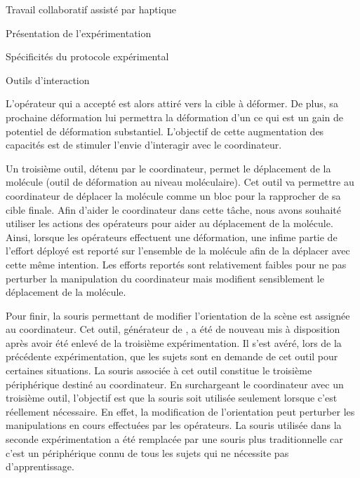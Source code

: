 \documentclass[myfrancais,ngerman,english,frenchb]{mythesis}
\begin{document}
\begin{mychapter}{Travail collaboratif assisté par haptique}
\begin{mysection}{Présentation de l'expérimentation}
\begin{mysubsection}{Spécificités du protocole expérimental}
\begin{mysubsubsection}{Outils d'interaction}
\begin{description}
							L'opérateur qui a accepté est alors attiré vers la cible à déformer.
							De plus, sa prochaine déformation lui permettra la déformation d'un  ce qui est un gain de potentiel de déformation substantiel.
							L'objectif de cette augmentation des capacités est de stimuler l'envie d'interagir avec le coordinateur.
						\item[Outil de manipulation]
							Un troisième outil, détenu par le coordinateur, permet le déplacement de la molécule (outil de déformation au niveau moléculaire).
							Cet outil va permettre au coordinateur de déplacer la molécule comme un bloc pour la rapprocher de sa cible finale.
							Afin d'aider le coordinateur dans cette tâche, nous avons souhaité utiliser les actions des opérateurs pour aider au déplacement de la molécule.
							Ainsi, lorsque les opérateurs effectuent une déformation, une infime partie de l'effort déployé est reporté sur l'ensemble de la molécule afin de la déplacer avec cette même intention.
							Les efforts reportés sont relativement faibles pour ne pas perturber la manipulation du coordinateur mais modifient sensiblement le déplacement de la molécule.
						\item[Outil d'orientation]
							Pour finir, la souris permettant de modifier l'orientation de la scène est assignée au coordinateur.
							Cet outil, générateur de , a été de nouveau mis à disposition après avoir été enlevé de la troisième expérimentation.
							Il s'est avéré, lors de la précédente expérimentation, que les sujets sont en demande de cet outil pour certaines situations.
							La souris associée à cet outil constitue le troisième périphérique destiné au coordinateur.
							En surchargeant le coordinateur avec un troisième outil, l'objectif est que la souris soit utilisée seulement lorsque c'est réellement nécessaire.
							En effet, la modification de l'orientation peut perturber les manipulations en cours effectuées par les opérateurs.
							La souris \myThreeD utilisée dans la seconde expérimentation a été remplacée par une souris \myUSB plus traditionnelle car c'est un périphérique connu de tous les sujets qui ne nécessite pas d'apprentissage.
					\end{description}
				\end{mysubsubsection}
				\begin{mytable}
					\newcommand{\mytitlecolumn}[2]{%
						\multirow{#1}*{%
}}
\end{mytable}
\end{mysubsection}
\end{mysection}
\end{mychapter}
\end{document}
